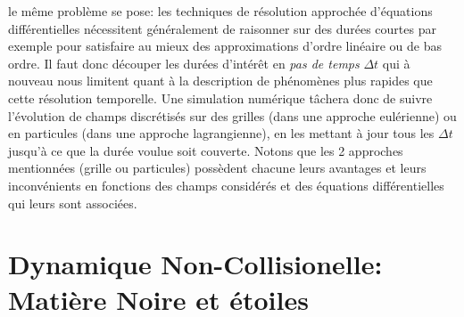  le même problème se pose: les techniques de résolution approchée d'équations différentielles nécessitent généralement de raisonner sur des durées courtes par exemple pour satisfaire au mieux des approximations d'ordre linéaire ou de bas ordre. Il faut donc découper les durées d'intérêt en \textit{pas de temps} $\Delta t$ qui à nouveau nous limitent quant à la description de phénomènes plus rapides que cette résolution temporelle. Une simulation numérique tâchera donc de suivre l'évolution de champs discrétisés sur des grilles (dans une approche eulérienne) ou en particules (dans une approche lagrangienne), en les mettant à jour tous les $\Delta t$ jusqu'à ce que la durée voulue soit couverte. Notons que les 2 approches mentionnées (grille ou particules) possèdent chacune leurs avantages et leurs inconvénients en fonctions des champs considérés et des équations différentielles qui leurs sont associées.


\section{Dynamique Non-Collisionelle: Matière Noire et étoiles}


